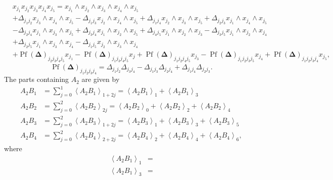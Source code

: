 \documentclass[aps,preprint]{revtex4}%
\begin{document}
\begin{align}
&  x_{j_{1}}x_{j_{2}}x_{j_{3}}x_{j_{4}}x_{j_{5}}=x_{j_{1}}\wedge x_{j_{2}%
}\wedge x_{j_{3}}\wedge x_{j_{4}}\wedge x_{j_{5}}\nonumber\\
&  +\Delta_{j_{1}j_{2}}x_{j_{3}}\wedge x_{j_{4}}\wedge x_{j_{5}}-\Delta
_{j_{1}j_{3}}x_{j_{2}}\wedge x_{j_{4}}\wedge x_{j_{5}}+\Delta_{j_{1}j_{4}%
}x_{j_{2}}\wedge x_{j_{3}}\wedge x_{j_{5}}+\Delta_{j_{2}j_{3}}x_{j_{1}}\wedge
x_{j_{4}}\wedge x_{j_{5}}\nonumber\\
&  -\Delta_{j_{2}j_{4}}x_{j_{1}}\wedge x_{j_{3}}\wedge x_{j_{5}}+\Delta
_{j_{3}j_{4}}x_{j_{1}}\wedge x_{j_{2}}\wedge x_{j_{5}}+\Delta_{j_{4}j_{5}%
}x_{j_{1}}\wedge x_{j_{2}}\wedge x_{j_{3}}-\Delta_{j_{3}j_{5}}x_{j_{1}}\wedge
x_{j_{2}}\wedge x_{j_{4}}\nonumber\\
&  +\Delta_{j_{2}j_{5}}x_{j_{1}}\wedge x_{j_{3}}\wedge x_{j_{4}}-\Delta
_{j_{1}j_{5}}x_{j_{2}}\wedge x_{j_{3}}\wedge x_{j_{4}}\nonumber\\
&  +\operatorname*{Pf}\left(  \mathbf{\Delta}\right)  _{j_{2}j_{3}j_{4}j_{5}%
}x_{j_{1}}-\operatorname*{Pf}\left(  \mathbf{\Delta}\right)  _{j_{1}j_{3}%
j_{4}j_{5}}x_{j}+\operatorname*{Pf}\left(  \mathbf{\Delta}\right)
_{j_{1}j_{2}j_{4}j_{5}}x_{j_{3}}-\operatorname*{Pf}\left(  \mathbf{\Delta
}\right)  _{j_{1}j_{2}j_{3}j_{5}}x_{j_{4}}+\operatorname*{Pf}\left(
\mathbf{\Delta}\right)  _{j_{1}j_{2}j_{3}j_{4}}x_{j_{5}},
\end{align}%
\begin{equation}
\operatorname*{Pf}\left(  \mathbf{\Delta}\right)  _{j_{1}j_{2}j_{3}j_{4}%
}=\Delta_{j_{1}j_{2}}\Delta_{j_{3}j_{4}}-\Delta_{j_{1}j_{3}}\Delta_{j_{2}%
j_{4}}+\Delta_{j_{1}j_{4}}\Delta_{j_{2}j_{3}}.
\end{equation}
The parts containing $A_{2}$ are given by
\begin{align}
A_{2}B_{1}  &  =\sum_{j=0}^{1}\left\langle A_{2}B_{1}\right\rangle
_{1+2j}=\left\langle A_{2}B_{1}\right\rangle _{1}+\left\langle A_{2}%
B_{1}\right\rangle _{3}\\
A_{2}B_{2}  &  =\sum_{j=0}^{2}\left\langle A_{2}B_{2}\right\rangle
_{2j}=\left\langle A_{2}B_{2}\right\rangle _{0}+\left\langle A_{2}%
B_{2}\right\rangle _{2}+\left\langle A_{2}B_{2}\right\rangle _{4}\\
A_{2}B_{3}  &  =\sum_{j=0}^{2}\left\langle A_{2}B_{3}\right\rangle
_{1+2j}=\left\langle A_{2}B_{3}\right\rangle _{1}+\left\langle A_{2}%
B_{3}\right\rangle _{3}+\left\langle A_{2}B_{3}\right\rangle _{5}\\
A_{2}B_{4}  &  =\sum_{j=0}^{2}\left\langle A_{2}B_{4}\right\rangle
_{2+2j}=\left\langle A_{2}B_{4}\right\rangle _{2}+\left\langle A_{2}%
B_{4}\right\rangle _{4}+\left\langle A_{2}B_{4}\right\rangle _{6},
\end{align}
where
\begin{align}
\left\langle A_{2}B_{1}\right\rangle _{1}  &  =\\
\left\langle A_{2}B_{1}\right\rangle _{3}  &  =
\end{align}
%
\end{document}
